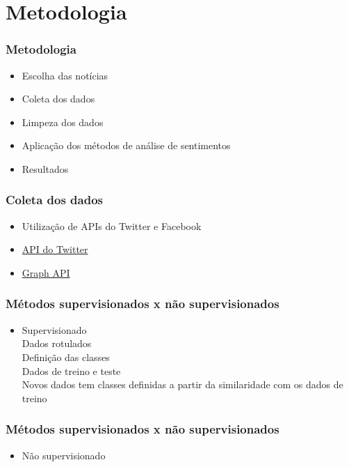 \documentclass{beamer}
\begin{document}
\section{Metodologia}
\begin{frame}%
\frametitle{\textbf{Metodologia}\transdissolve}%
\begin{itemize}%
\item<1->Escolha das notícias
\item<2->Coleta dos dados
\item<3->Limpeza dos dados
\item<4->Aplicação dos métodos de análise de sentimentos
\item<5->Resultados
\end{itemize}
\end{frame}

\begin{frame}%
\frametitle{\textbf{Coleta dos dados}\transdissolve}%
\begin{itemize}%
\item<1->Utilização de APIs do Twitter e Facebook 
\item<2->\href{https://developer.twitter.com/en/docs/api-reference-index}{API do Twitter}
\item<3->\href{https://developers.facebook.com/docs/graph-api?locale=pt_BR}{Graph API}
\end{itemize}
\end{frame}

\begin{frame}%
\frametitle{\textbf{Métodos supervisionados x não supervisionados}\transdissolve}%
\begin{itemize}%
\item<1->Supervisionado\\
\quad Dados rotulados\\
\quad Definição das classes\\
\quad Dados de treino e teste\\
\quad Novos dados tem classes definidas a partir da similaridade com os dados de treino
\end{itemize}
\end{frame}

\begin{frame}%
\frametitle{\textbf{Métodos supervisionados x não supervisionados}\transdissolve}%
\begin{itemize}%
\item<1->Não supervisionado\\
\end{itemize}
\end{frame}
\end{document}
